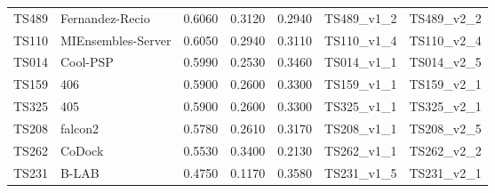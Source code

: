 \begin{table}[ht]
{\begin{tabular}{llrrrll}
TS489 & Fernandez-Recio & 0.6060 & 0.3120 & 0.2940 & TS489\_v1\_2 & TS489\_v2\_2 \\ 
TS110 & MIEnsembles-Server & 0.6050 & 0.2940 & 0.3110 & TS110\_v1\_4 & TS110\_v2\_4 \\ 
TS014 & Cool-PSP & 0.5990 & 0.2530 & 0.3460 & TS014\_v1\_1 & TS014\_v2\_5 \\ 
TS159 & 406 & 0.5900 & 0.2600 & 0.3300 & TS159\_v1\_1 & TS159\_v2\_1 \\ 
TS325 & 405 & 0.5900 & 0.2600 & 0.3300 & TS325\_v1\_1 & TS325\_v2\_1 \\ 
TS208 & falcon2 & 0.5780 & 0.2610 & 0.3170 & TS208\_v1\_1 & TS208\_v2\_5 \\ 
TS262 & CoDock & 0.5530 & 0.3400 & 0.2130 & TS262\_v1\_1 & TS262\_v2\_2 \\ 
TS231 & B-LAB & 0.4750 & 0.1170 & 0.3580 & TS231\_v1\_5 & TS231\_v2\_1 \\ 
\bottomrule
\end{tabular}%
}
\end{table}
